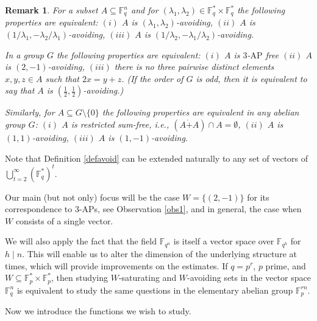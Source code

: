 \documentclass[11pt]{article}
\numberwithin{table}{section}
\newcommand{\F}{{\mathbb F}}
\newtheorem{example}[theorem]{Example}
\newtheorem{remark}[theorem]{Remark}
\theoremstyle{definition}
\begin{document}
	\begin{remark}
		\label{r1}
		For a subset $A\subseteq \F_q^n$ and for $(\lambda_1,\lambda_2)\in \F_q^*\times \F_q^*$ the following properties are equivalent: $(i)$ $A$ is $(\lambda_1,\lambda_2)$-avoiding, $(ii)$ $A$ is $(1/\lambda_1,-\lambda_2/\lambda_1)$-avoiding, $(iii)$ $A$ is $(1/\lambda_2,-\lambda_1/\lambda_2)$-avoiding.
		
		In a group $G$ the following properties are equivalent: $(i)$ $A$ is $3$-$\mathrm{AP}$ free $(ii)$ $A$ is $(2,-1)$-avoiding, $(iii)$ there is no three pairwise distinct elements $x,y,z\in A$ such that $2x=y+z$. (If the order of $G$ is odd, then it is equivalent to say that $A$ is $(\frac12, \frac12)$-avoiding.)
		
		Similarly, for $A \subseteq G \setminus \{0\}$ the following properties are equivalent in any abelian group $G$: $(i)$ $A$ is restricted sum-free, i.e., $(A\dot+A)\cap A= \emptyset$, $(ii)$ $A$ is $(1,1)$-avoiding, $(iii)$ $A$ is $(1,-1)$-avoiding.
	\end{remark}
	
	
	\vspace{-0.3cm}
	Note that Definition \ref{defavoid} can be extended naturally to any set of vectors of $\bigcup_{t=2}^\infty (\F_q^*)^t$.
	
	Our main (but not only) focus will be the case $W=\{(2,-1)\}$
	for its correspondence to  $3$-$\mathrm{AP}$s, see Observation \ref{obs1}, and in general, the case when $W$ consists of a single vector.
	
	
	We will also apply the fact that the field $\F_{q^n}$ is itself a vector space over $\F_{q^h}$ for  $h \mid n$. This will enable us to alter the dimension of the underlying structure at times, which will provide improvements on the estimates. If $q=p^r$, $p$ prime, and $W \subseteq \F_p^* \times \F_p^*$, then studying $W$-saturating and $W$-avoiding sets in the vector space $\F_q^n$ is equivalent to study the same questions in the elementary abelian group $\F_p^{rn}$.
	
	Now we introduce the functions we wish to study.
	
\end{document}

